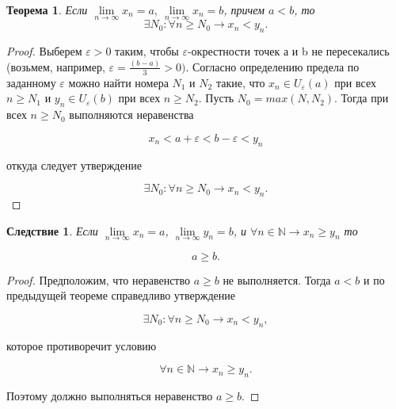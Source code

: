 \documentclass[a4paper,12pt]{article}
\newtheorem*{ther}{Теорема}
\newtheorem*{Consequence}{Следствие}
\begin{document}
    \begin{ther}
        Если  $\lim\limits_{n\rightarrow \infty }x_{n}=a,~ \lim\limits_{n\rightarrow \infty }x_{n}=b$, причем  $a<b$, то
        $$\exists N_{0} :\forall n\geq N_{0} \rightarrow x_{n}< y_{n}.$$
    \end{ther}

    \begin{proof}
        Выберем  $\varepsilon > 0$  таким, чтобы $\varepsilon$-окрестности  точек а и b не пересекались (возьмем, например,  $\varepsilon =\frac{\left ( b-a \right )}{3}>0)$.  Согласно определению предела по заданному $\varepsilon$ можно найти номера  $N_{1}$ и $N_{2}$ такие, что $x_{n}\in U_{\varepsilon}(a)$ при всех   $n\geq N_{1}$ и    $y_{n}\in U_{\varepsilon}(b)$ при всех   $n\geq N_{2}$. Пусть  $N_{0}= max\left ( N, N_{2} \right )$. Тогда при всех  $n\geq N_{0}$ выполняются неравенства

        $$x_{n}<a+\varepsilon <b-\varepsilon < y_{n}$$

        откуда следует утверждение

        $$\exists N_{0} :\forall n\geq N_{0} \rightarrow x_{n}< y_{n}.$$

    \end{proof}

    \begin{Consequence}
        Если  $\lim\limits_{n\rightarrow \infty }x_{n}=a$, $\lim\limits_{n\rightarrow \infty }y_{n}=b$, и  $\forall n\in \mathbb{N}\rightarrow x_{n}\geq y_{n}$  то

        $$a\geq b.$$
    \end{Consequence}

    \begin{proof}
        Предположим, что неравенство   $a\geq b$ не выполняется. Тогда $a < b$
        и по предыдущей теореме справедливо утверждение

        $$\exists N_{0} :\forall n\geq N_{0} \rightarrow x_{n}< y_{n},$$

        которое противоречит  условию

        $$\forall n\in \mathbb{N}\rightarrow x_{n}\geq y_{n}.$$

        Поэтому должно выполняться неравенство  $a\geq b$.
    \end{proof}
\end{document}
